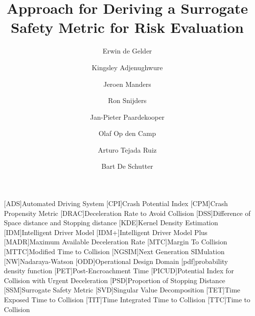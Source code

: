 \documentclass[3p,onecolumn,authoryear]{elsarticle}
\title{Approach for Deriving a Surrogate Safety Metric for Risk Evaluation}
\author[1,2]{Erwin de Gelder\corref{cor1}}
\author[3]{Kingsley Adjenughwure}
\author[1]{Jeroen Manders}
\author[4]{Ron Snijders}
\author[1,5]{Jan-Pieter Paardekooper}
\author[1]{Olaf Op den Camp}
\author[1]{Arturo Tejada Ruiz}
\author[1,2]{Bart De Schutter}
\date{}
\begin{document}
\begin{acronym}[AAAAAAAA]
	[ADS]{Automated Driving System}
	[CPI]{Crash Potential Index}
	[CPM]{Crash Propensity Metric}
	[DRAC]{Deceleration Rate to Avoid Collision}
	[DSS]{Difference of Space distance and Stopping distance}
	[KDE]{Kernel Density Estimation}
	[IDM]{Intelligent Driver Model}
	[IDM+]{Intelligent Driver Model Plus}
	[MADR]{Maximum Available Deceleration Rate}
	[MTC]{Margin To Collision}
	[MTTC]{Modified Time to Collision}
	[NGSIM]{Next Generation SIMulation}
	[NW]{Nadaraya-Watson}
	[ODD]{Operational Design Domain}
	[pdf]{probability density function}
	[PET]{Post-Encroachment Time}
	[PICUD]{Potential Index for Collision with Urgent Deceleration}
	[PSD]{Proportion of Stopping Distance}
	[SSM]{Surrogate Safety Metric}
	[SVD]{Singular Value Decomposition}
	[TET]{Time Exposed Time to Collision}
	[TIT]{Time Integrated Time to Collision}
	[TTC]{Time to Collision}
\end{acronym}



\maketitle











\end{document}
